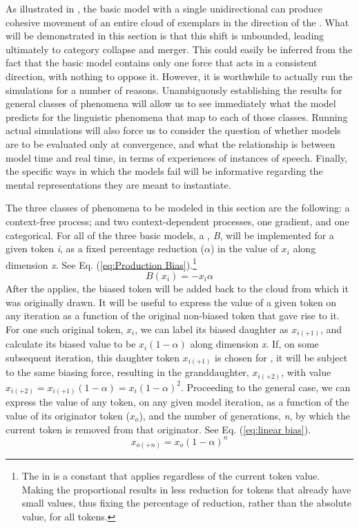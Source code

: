 As illustrated in , the basic
 model with a single unidirectional  can produce cohesive
movement of an entire cloud of exemplars in the direction of the .
What will be demonstrated in this section is that this shift is unbounded,
leading ultimately to category collapse and merger. This could easily
be inferred from the fact that the basic model contains only one force
that acts in a consistent direction, with nothing to oppose it. However,
it is worthwhile to actually run the simulations for a number of reasons.
Unambiguously establishing the results for general classes of phenomena
will allow us to see immediately what the model predicts for the linguistic
phenomena that map to each of those classes. Running actual simulations
will also force us to consider the question of whether  models
are to be evaluated only at convergence, and what the relationship
is between model time and real time, in terms of experiences of instances
of speech. Finally, the specific ways in which the models fail will
be informative regarding the mental representations they are meant to instantiate.

The three classes of phenomena to be modeled in this section are the
following: a context-free process; and two context-dependent processes, 
one gradient, and one categorical. For all of the three basic models,
a  , \emph{B}, will be implemented for a given token
\emph{i}, as a fixed percentage reduction ($\alpha$) in the value
of \emph{$x_{i}$} along dimension \emph{x}. See Eq. (\ref{eq:Production Bias}).\footnote{The   in \citet{Pierrehumbert2000} is a constant that
applies regardless of the current token value. Making the  proportional
results in less reduction for tokens that already have small values, thus
fixing the percentage of reduction, rather than the absolute value,
for all tokens.} 
\begin{equation}
B(x_{i})=-x_{i}\alpha\label{eq:Production Bias}
\end{equation}
After the   applies, the biased token will be added
back to the cloud from which it was originally drawn. It will be useful
to express the value of a given token on any iteration as a function
of the original non-biased token that gave rise to it. For one such
original token, $x_{i}$, we can label its biased daughter as $x_{i(+1)}$,
and calculate its biased value to be $x_{i}(1-\alpha)$
along dimension \emph{x}. If, on some subsequent iteration, this daughter
token $x_{i(+1)}$ is chosen for , it will be subject to
the same biasing force, resulting in the granddaughter, $x_{i(+2)}$,
with value $x_{i(+2)}=x_{i(+1)}(1-\alpha)=x_{i}(1-\alpha)^{2}$.
Proceeding to the general case, we can express the value of any token,
on any given model iteration, as a function of the value of its originator
token ($x_{o}$), and the number of generations, \emph{n}, by which
the current token is removed from that originator. See Eq. (\ref{eq:linear bias}). 
\begin{equation}
x_{o(+n)}=x_{o}\left(1-\alpha\right)^{n}\label{eq:linear bias}
\end{equation}


